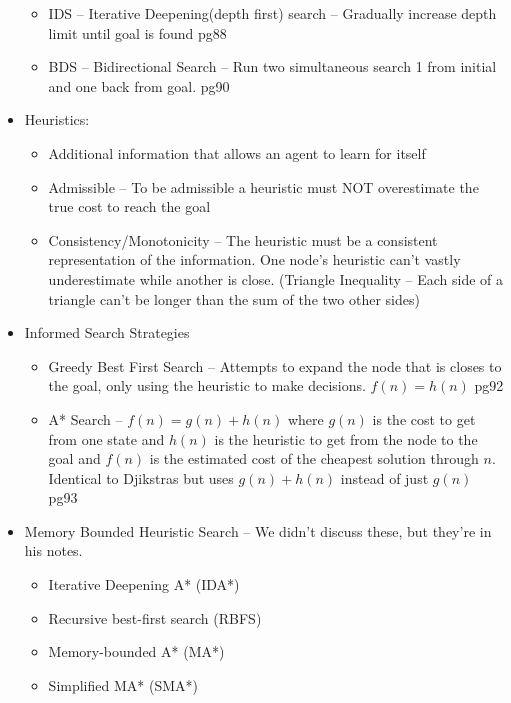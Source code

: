 \documentclass{article}
\begin{document}
\begin{itemize}
\begin{itemize}
		\item IDS -- Iterative Deepening(depth first) search -- Gradually increase depth limit until goal is found pg88
		\item BDS -- Bidirectional Search -- Run two simultaneous search 1 from initial and one back from goal. pg90
	\end{itemize}
	\item Heuristics:
	\begin{itemize}
		\item Additional information that allows an agent to learn for itself
		\item Admissible -- To be admissible a heuristic must NOT overestimate the true cost to reach the goal
		\item Consistency/Monotonicity -- The heuristic must be a consistent representation of the information. One node's heuristic can't vastly underestimate while another is close. (Triangle Inequality -- Each side of a triangle can't be longer than the sum of the two other sides)
	\end{itemize}
	\item Informed Search Strategies
	\begin{itemize}
		\item Greedy Best First Search -- Attempts to expand the node that is closes to the goal, only using the heuristic to make decisions. $f(n)=h(n)$ pg92
		\item A* Search -- $f(n) = g(n)+h(n)$ where $g(n)$ is the cost to get from one state and $h(n)$ is the heuristic to get from the node to the goal and $f(n)$ is the estimated cost of the cheapest solution through $n$. Identical to Djikstras but uses $g(n) + h(n)$ instead of just $g(n)$ pg93
	\end{itemize}
	\item Memory Bounded Heuristic Search -- We didn't discuss these, but they're in his notes.
	\begin{itemize}
		\item Iterative Deepening A* (IDA*)
		\item Recursive best-first search (RBFS)
		\item Memory-bounded A* (MA*)
		\item Simplified MA* (SMA*)		
	\end{itemize}
\end{itemize}
\end{document}
